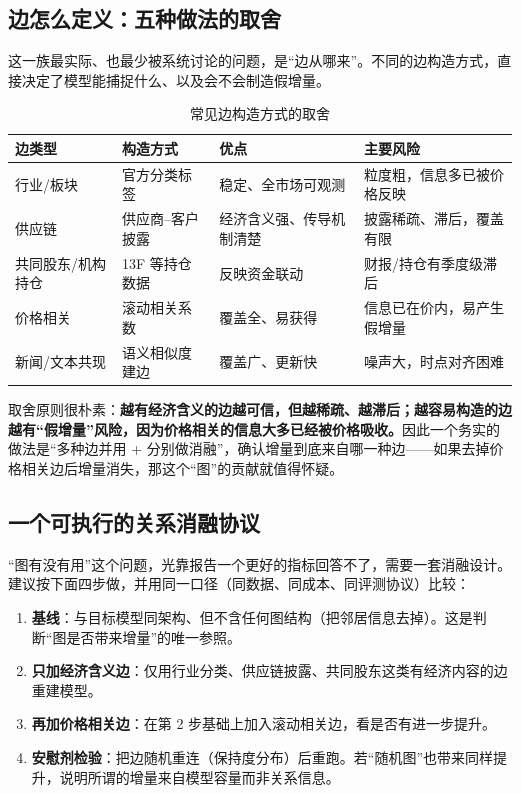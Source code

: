 \subsection{边怎么定义：五种做法的取舍}

这一族最实际、也最少被系统讨论的问题，是“边从哪来”。不同的边构造方式，直接决定了模型能捕捉什么、以及会不会制造假增量。

\begin{table}[htbp]
\centering
\caption{常见边构造方式的取舍}
\label{tab:edges}
\begin{tabular}{@{}>{\raggedright\arraybackslash}p{2.6cm}>{\raggedright\arraybackslash}p{4.2cm}>{\raggedright\arraybackslash}p{3.4cm}>{\raggedright\arraybackslash}p{4.0cm}@{}}
\toprule
边类型 & 构造方式 & 优点 & 主要风险 \\
\midrule
行业/板块 & 官方分类标签 & 稳定、全市场可观测 & 粒度粗，信息多已被价格反映 \\
供应链 & 供应商--客户披露 & 经济含义强、传导机制清楚 & 披露稀疏、滞后，覆盖有限 \\
共同股东/机构持仓 & 13F 等持仓数据 & 反映资金联动 & 财报/持仓有季度级滞后 \\
价格相关 & 滚动相关系数 & 覆盖全、易获得 & 信息已在价内，易产生假增量 \\
新闻/文本共现 & 语义相似度建边 & 覆盖广、更新快 & 噪声大，时点对齐困难 \\
\bottomrule
\end{tabular}
\end{table}

取舍原则很朴素：\textbf{越有经济含义的边越可信，但越稀疏、越滞后；越容易构造的边越有“假增量”风险，因为价格相关的信息大多已经被价格吸收。}因此一个务实的做法是“多种边并用 + 分别做消融”，确认增量到底来自哪一种边——如果去掉价格相关边后增量消失，那这个“图”的贡献就值得怀疑。

\subsection{一个可执行的关系消融协议}

“图有没有用”这个问题，光靠报告一个更好的指标回答不了，需要一套消融设计。建议按下面四步做，并用同一口径（同数据、同成本、同评测协议）比较：

\begin{enumerate}
  \item \textbf{基线}：与目标模型同架构、但不含任何图结构（把邻居信息去掉）。这是判断“图是否带来增量”的唯一参照。
  \item \textbf{只加经济含义边}：仅用行业分类、供应链披露、共同股东这类有经济内容的边重建模型。
  \item \textbf{再加价格相关边}：在第 2 步基础上加入滚动相关边，看是否有进一步提升。
  \item \textbf{安慰剂检验}：把边随机重连（保持度分布）后重跑。若“随机图”也带来同样提升，说明所谓的增量来自模型容量而非关系信息。
\end{enumerate}

